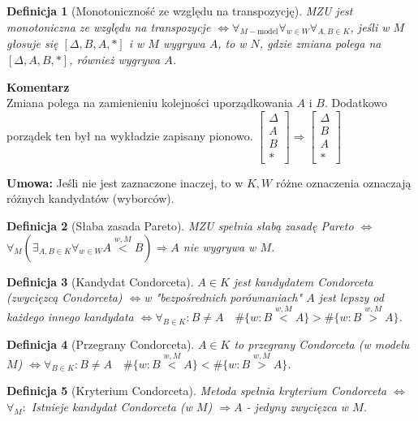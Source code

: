 \documentclass[12pt,a4paper]{article}
\theoremstyle{break}
\newcommand{\Komentarz}[1]{
	\begin{mdframed}[style=zadanie]
		\textbf{Komentarz}\\
		#1
	\end{mdframed}
	}
\newtheorem{definition}{Definicja}[section]
\newcommand{\witw}{$\Leftrightarrow$}
\begin{document}
		\begin{definition}[Monotoniczność ze względu na transpozycję]
			MZU jest monotoniczna ze względu na transpozycje \witw $\forall_{M-\text{model}} \forall_{w\in W} \forall_{A,B\in K}$, jeśli w $M$ głosuje się $[\Delta, B, A, *]$ i w $M$ wygrywa $A$, to w $N$, gdzie zmiana polega na $[\Delta, A, B, *]$, również wygrywa $A$.
		\end{definition}
		
		\Komentarz{Zmiana polega na zamienieniu kolejności uporządkowania $A$ i $B$. Dodatkowo porządek ten był na wykładzie zapisany pionowo. $\begin{bmatrix}
				\Delta\\
				A\\
				B\\
				*
			\end{bmatrix} \Rightarrow \begin{bmatrix}
			\Delta\\
			B\\
			A\\
			*
		\end{bmatrix}$
		}
		
		{\textbf{Umowa:}} Jeśli nie jest zaznaczone inaczej, to w $K,W$ różne oznaczenia oznaczają różnych kandydatów (wyborców).
		
		\begin{definition}[Słaba zasada Pareto]
			MZU spełnia słabą zasadę Pareto \witw $\forall_M (\exists_{A,B\in K}\forall_{w\in W} A\overset{w,M}{<}B) \Rightarrow A$ nie wygrywa w $M$.
		\end{definition}
		
		\begin{definition}[Kandydat Condorceta]
			$A\in K$ jest kandydatem Condorceta (zwycięzcą Condorceta) \witw w "bezpośrednich porównaniach" $A$ jest lepszy od każdego innego kandydata \witw $\forall_{B \in K}: B\neq A \quad \#\{w: B\overset{w,M}{<}A\}>\#\{w: B\overset{w,M}{>}A\}$.
		\end{definition}
		
		\begin{definition}[Przegrany Condorceta]
			$A\in K$ to przegrany Condorceta (w modelu $M$) \witw $\forall_{B \in K}: B\neq A \quad\#\{w: B\overset{w,M}{<}A\}<\#\{w: B\overset{w,M}{>}A\}$.
		\end{definition}
		
		\begin{definition}[Kryterium Condorceta]
			Metoda spełnia kryterium Condorceta \witw $\forall_M:$ Istnieje kandydat Condorceta (w $M$) $\Rightarrow A$ - jedyny zwycięzca w $M$.
		\end{definition}
		
\end{document}
